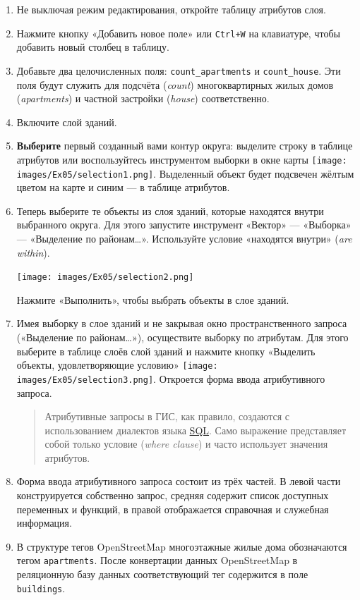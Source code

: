 \documentclass[
  12pt,
]{book}
\begin{document}
\begin{enumerate}
\def\labelenumi{\arabic{enumi}.}
\item
  Не выключая режим редактирования, откройте таблицу атрибутов слоя.
\item
  Нажмите кнопку «Добавить новое поле» или \texttt{Ctrl+W} на клавиатуре, чтобы добавить новый столбец в таблицу.
\item
  Добавьте два целочисленных поля: \texttt{count\_apartments} и \texttt{count\_house}. Эти поля будут служить для подсчёта (\emph{count}) многоквартирных жилых домов (\emph{apartments}) и частной застройки (\emph{house}) соответственно.
\item
  Включите слой зданий.
\item
  \textbf{Выберите} первый созданный вами контур округа: выделите строку в таблице атрибутов или воспользуйтесь инструментом выборки в окне карты \texttt{[image: images/Ex05/selection1.png]}. Выделенный объект будет подсвечен жёлтым цветом на карте и синим --- в таблице атрибутов.
\item
  Теперь выберите те объекты из слоя зданий, которые находятся внутри выбранного округа. Для этого запустите инструмент «Вектор» --- «Выборка» --- «Выделение по районам\ldots». Используйте условие «находятся внутри» (\emph{are within}).

  \texttt{[image: images/Ex05/selection2.png]}

  Нажмите «Выполнить», чтобы выбрать объекты в слое зданий.
\item
  Имея выборку в слое зданий и не закрывая окно пространственного запроса («Выделение по районам\ldots»), осуществите выборку по атрибутам. Для этого выберите в таблице слоёв слой зданий и нажмите кнопку «Выделить объекты, удовлетворяющие условию» \texttt{[image: images/Ex05/selection3.png]}. Откроется форма ввода атрибутивного запроса.

  \begin{quote}
  Атрибутивные запросы в ГИС, как правило, создаются с использованием диалектов языка \href{https://ru.wikipedia.org/wiki/SQL}{SQL}. Само выражение представляет собой только условие (\emph{where clause}) и часто использует значения атрибутов.
  \end{quote}
\item
  Форма ввода атрибутивного запроса состоит из трёх частей. В левой части конструируется собственно запрос, средняя содержит список доступных переменных и функций, в правой отображается справочная и служебная информация.
\item
  В структуре тегов OpenStreetMap многоэтажные жилые дома обозначаются тегом \texttt{apartments}. После конвертации данных OpenStreetMap в реляционную базу данных соответствующий тег содержится в поле \texttt{buildings}.


\end{enumerate}
\end{document}
